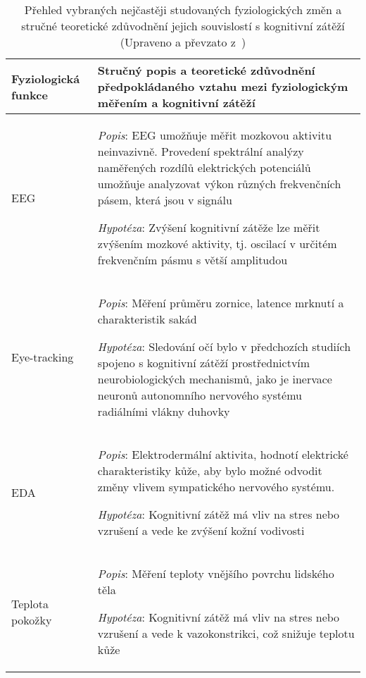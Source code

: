\begin{table}[!htb]
    \renewcommand{\arraystretch}{1.5}
    \centering
    \begin{threeparttable}
        \caption{Přehled vybraných nejčastěji studovaných fyziologických změn a
            stručné teoretické zdůvodnění jejich souvislostí s kognitivní zátěží
            (Upraveno a převzato z~\cite{Vanneste2021})}
        \label{tab:prehled_fyziologicke_projevy_CL_tab1}
        \scriptsize
        \begin{tabular}{p{3cm}p{11cm}}
            \toprule
            Fyziologická funkce & Stručný popis a teoretické zdůvodnění předpokládaného vztahu mezi fyziologickým měřením a kognitivní zátěží
            \\ \midrule
            EEG                 & \textit{Popis}: \gls{EEG} umožňuje měřit mozkovou aktivitu neinvazivně. Provedení spektrální analýzy naměřených rozdílů elektrických potenciálů umožňuje analyzovat výkon různých frekvenčních pásem, která jsou v signálu\newline
            \rule{0pt}{2.5ex}\noindent
            \textit{Hypotéza}: Zvýšení kognitivní zátěže lze měřit zvýšením mozkové aktivity, tj. oscilací v určitém frekvenčním pásmu s větší amplitudou~\cite{Antonenko2010}
            \\
            Eye-tracking        & \textit{Popis}: Měření průměru zornice, latence mrknutí a charakteristik sakád\newline
            \rule{0pt}{2.5ex}\noindent
            \textit{Hypotéza}: Sledování očí bylo v předchozích studiích spojeno s kognitivní zátěží prostřednictvím neurobiologických mechanismů, jako je inervace neuronů autonomního nervového systému radiálními vlákny duhovky~\cite{Wel2018}
            \\
            EDA                 & \textit{Popis}: Elektrodermální aktivita, hodnotí elektrické charakteristiky kůže, aby bylo možné odvodit změny vlivem sympatického nervového systému.\newline
            \rule{0pt}{2.5ex}\noindent
            \textit{Hypotéza}: Kognitivní zátěž má vliv na stres nebo vzrušení a vede ke zvýšení kožní vodivosti~\cite{Setz2010}
            \\
            Teplota pokožky     & \textit{Popis}: Měření teploty vnějšího povrchu lidského těla\newline
            \rule{0pt}{2.5ex}\noindent
            \textit{Hypotéza}: Kognitivní zátěž má vliv na stres nebo vzrušení a vede k vazokonstrikci, což snižuje teplotu kůže~\cite{Herborn2015}

\end{tabular}
\end{threeparttable}
\end{table}
